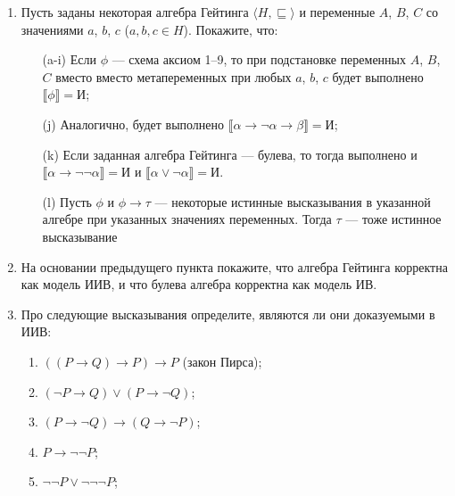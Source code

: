 \documentclass[10pt,a4paper,oneside]{article}
\begin{document}
\begin{enumerate}
\item Пусть заданы некоторая алгебра Гейтинга $\langle H, \sqsubseteq\rangle$
и переменные $A$, $B$, $C$ со значениями $a$, $b$, $c$ ($a,b,c \in H$). Покажите, что:
\begin{enumerate}
\item[(a-i)] Если $\phi$ --- схема аксиом 1--9, то при подстановке переменных $A$, $B$, $C$ вместо 
вместо метапеременных при любых $a$, $b$, $c$ будет выполнено $\llbracket\phi\rrbracket = \texttt{И}$;
\item[(j)] Аналогично, будет выполнено 
$\llbracket\alpha\rightarrow\neg\alpha\rightarrow\beta\rrbracket = \texttt{И}$;
\item[(k)] Если заданная алгебра Гейтинга --- булева, то тогда выполнено и
$\llbracket\alpha\rightarrow\neg\neg\alpha\rrbracket = \texttt{И}$ и 
$\llbracket\alpha\vee\neg\alpha\rrbracket = \texttt{И}$.
\item[(l)] Пусть $\phi$ и $\phi\rightarrow\tau$ --- некоторые истинные высказывания в указанной
алгебре при указанных значениях переменных. Тогда $\tau$ --- тоже истинное высказывание
\end{enumerate}

\item На основании предыдущего пункта покажите, что алгебра Гейтинга корректна как модель ИИВ,
и что булева алгебра корректна как модель ИВ.

\item Про следующие высказывания определите, являются ли они доказуемыми в ИИВ:
\begin{enumerate}
\item $((P\to Q)\to P)\to P$ (закон Пирса);
\item $(\neg P\to Q)\vee(P \to\neg Q)$;
\item $(P \to \neg Q) \rightarrow (Q \to \neg P)$;
\item $P \rightarrow \neg\neg P$;
\item $\neg\neg P \vee \neg\neg\neg P$;
\end{enumerate}

\end{enumerate}
\end{document}
